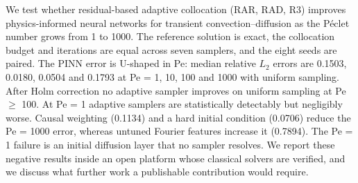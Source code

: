 We test whether residual-based adaptive collocation (RAR, RAD, R3) improves physics-informed neural networks
for transient convection--diffusion as the P\'eclet number grows from 1 to 1000. The reference solution is
exact, the collocation budget and iterations are equal across seven samplers, and the eight seeds are paired.
The PINN error is U-shaped in Pe: median relative $L_2$ errors are 0.1503, 0.0180, 0.0504 and 0.1793 at
Pe = 1, 10, 100 and 1000 with uniform sampling. After Holm correction no adaptive sampler improves on uniform
sampling at Pe $\ge$ 100. At Pe = 1 adaptive samplers are statistically detectably but negligibly worse.
Causal weighting (0.1134) and a hard initial condition (0.0706) reduce the Pe = 1000 error, whereas untuned
Fourier features increase it (0.7894). The Pe = 1 failure is an initial diffusion layer that no sampler
resolves. We report these negative results inside an open platform whose classical solvers are verified,
and we discuss what further work a publishable contribution would require.
